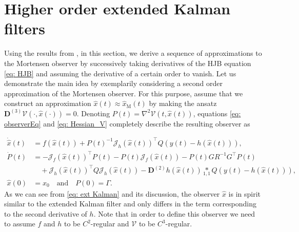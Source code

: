 \documentclass[11pt,reqno]{amsart}
\numberwithin{equation}{section}
\theoremstyle{plain}
\newcommand{\tenp}[2]{\underset{#1,#2}{*}}
\newcommand{\TenDeriv}[1]{\mathbf{D}^{(#1)}}
\begin{document}
\section{Higher order extended Kalman filters}
%
Using the results from , in this section, we derive a sequence of approximations to the Mortensen observer by successively taking derivatives of the HJB equation \eqref{eq: HJB} and assuming the derivative of a certain order to vanish. Let us demonstrate the main idea by exemplarily considering a second order approximation of the Mortensen observer. For this purpose, assume that we construct an approximation $\widehat{x}(t)\approx \widehat{x}_{\mathrm{M}}(t)$ by making the ansatz $\TenDeriv{3} \mathcal{V}(\cdot,\widehat{x}(\cdot)) = 0$. Denoting $P(t) = \nabla^2 \mathcal{V}(t,\widehat{x}(t))$, equations \eqref{eq: observerEq} and \eqref{eq: Hessian_V} completely describe the resulting observer as

\begin{equation}\label{EQ:SecondOrderObserver}
 \begin{aligned}
    \dot{\widehat{x}}(t) &= f(\widehat{x}(t)) 
	+ P(t)^{-1} \mathcal{J}_h(\widehat{x}(t))^\top Q (y(t) - h(\widehat{x}(t) ) ),
    \\
    \dot{P}(t) &=
    -\mathcal{J}_f(\widehat{x}(t))^\top  P(t)
    - P(t) \mathcal{J}_f(\widehat{x}(t)) 
    -  P(t) G R^{-1} G^\top  P(t)  \\
    &\quad + \mathcal{J}_h(\widehat{x}(t))^\top Q \mathcal{J}_h(\widehat{x}(t)) 
    - \TenDeriv{2} h (\widehat{x}(t))  \tenp{1}{1} Q (y(t)-h(\widehat{x}(t))), 
    \\
	\widehat{x}(0) &= x_0 \quad\text{and}\quad   P(0) = \Gamma.
  \end{aligned}
\end{equation}
As we can see from \eqref{eq: ext Kalman} and its discussion, the observer $\widehat{x}$ is in spirit similar to the extended Kalman filter and only differs in the term corresponding to the second derivative of $h$. Note that in order to define this observer we need to assume $f$ and $h$ to be $C^2$-regular and $\mathcal{V}$ to be $C^3$-regular. 
\end{document}
